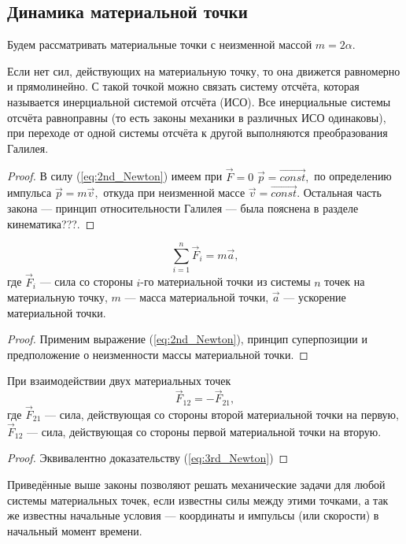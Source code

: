 \subsection{Динамика материальной точки}
Будем рассматривать материальные точки с неизменной массой $m = 2\alpha.$
\begin{theorem}
Если нет сил, действующих на материальную точку, то она движется равномерно и прямолинейно.
С такой точкой можно связать систему отсчёта, которая называется инерциальной системой
отсчёта (ИСО). Все инерциальные системы отсчёта равноправны (то есть законы механики
в различных ИСО одинаковы), при переходе от одной системы
отсчёта к другой выполняются преобразования Галилея.
\begin{proof}
В силу (\ref{eq:2nd_Newton}) имеем при $\vec{F} = 0$ $\vec{p} = \overrightarrow{const},$
по определению импульса $\vec {p} = m \vec{v},$ откуда при неизменной массе $\vec{v}=\overrightarrow{const}.$
Остальная часть закона --- принцип относительности Галилея --- была пояснена в
разделе кинематика???.
\end{proof}
\end{theorem}
\begin{theorem}
\begin{equation}
\sum \limits_{i=1}^{n}\vec{F}_i = m \vec{a},
\label{eq:2nd_Newton_point}
\end{equation}
где $\vec{F}_i$ --- сила со стороны $i$-го материальной точки
из системы $n$ точек на материальную точку, $m$ --- масса материальной точки,
$\vec{a}$ --- ускорение материальной точки.
\begin{proof}
Применим выражение (\ref{eq:2nd_Newton}), принцип суперпозиции и предположение
о неизменности массы материальной точки.
\end{proof}
\end{theorem}
\begin{theorem}
При взаимодействии двух материальных точек
\begin{equation}
\vec{F}_{12}=-\vec{F}_{21},
\label{eq:3rd_Newton_point}
\end{equation}
где $\vec{F}_{21}$ --- сила, действующая
со стороны второй материальной точки на первую, $\vec{F}_{12}$ --- сила,
действующая со стороны первой материальной точки на вторую.
\begin{proof}
Эквивалентно доказательству (\ref{eq:3rd_Newton})
\end{proof}
\end{theorem}
Приведённые выше законы позволяют решать механические задачи для
любой системы материальных точек, если известны силы между этими  точками,
а так же известны начальные условия --- координаты и импульсы (или скорости)
в начальный момент времени.
